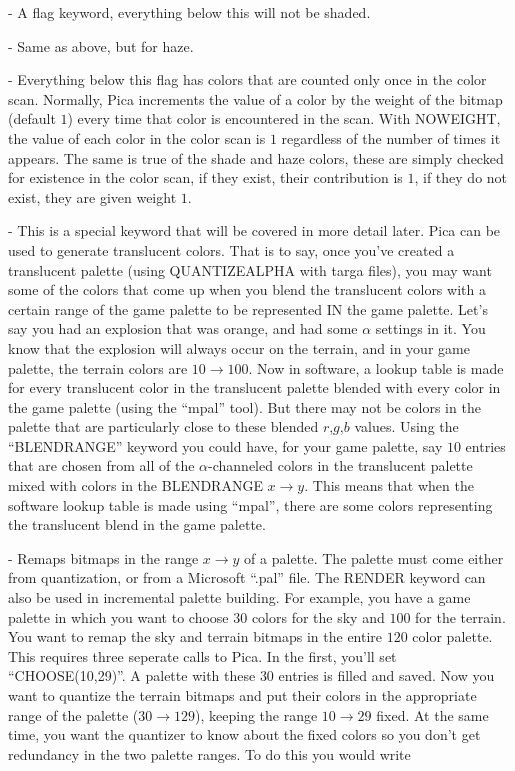  - A flag keyword, everything below this will not be shaded. 

 - Same as above, but for haze.

 - Everything below this flag has colors that are counted only once
in the color scan. Normally, Pica increments the value of a color by the weight of the bitmap
(default $1$) every time that color is encountered in the scan. With NOWEIGHT, the value
of each color in the color scan is $1$ regardless of the number of times it appears. The
same is true of the shade and haze colors, these are simply checked for existence in the color
scan, if they exist, their contribution is $1$, if they do not exist, they are given weight
$1$.

 - This is a special keyword that will be covered in more detail
later. Pica can be used to generate translucent colors. That is to say, once you've created
a translucent palette (using QUANTIZEALPHA with targa files), you may want some of the colors
that come up when you blend the translucent colors with a certain range of the game palette
to be represented IN the game palette. Let's say you had an explosion that was orange, and
had some $\alpha$ settings in it. You know that the explosion will always occur on the terrain,
and in your game palette, the terrain colors are $10 \rightarrow 100$. Now in software,
a lookup table is made for every translucent color in the translucent palette blended with
every color in the game palette (using the ``mpal'' tool). But there may not be colors in the
palette that are particularly close to these blended $r$,$g$,$b$ values. Using the
``BLENDRANGE'' keyword you could have, for your game palette, say $10$ entries that are chosen
from all of the $\alpha$-channeled colors in the translucent palette mixed with colors in 
the BLENDRANGE $x \rightarrow y$. This means that when the software lookup table is made using
``mpal'', there are some colors representing the translucent blend in the game palette.



 - Remaps bitmaps in the range $x \rightarrow y$ of a palette.
The palette must come either from quantization, or from a Microsoft ``.pal'' file. The RENDER
keyword can also be used in incremental palette building. For example, you have a game
palette in which you want to choose $30$ colors for the sky and $100$ for the terrain. You want
to remap the sky and terrain bitmaps in the entire $120$ color palette. This requires three
seperate calls to Pica. In the first, you'll set ``CHOOSE(10,29)''. A palette with these $30$
entries is filled and saved. Now you want to quantize the terrain bitmaps and put their colors
in the appropriate range of the palette ($30\rightarrow 129$), keeping the range $10\rightarrow
29$ fixed. At the same time, you want the quantizer to know about the fixed colors so you don't
get redundancy in the two palette ranges. To do this you would write


